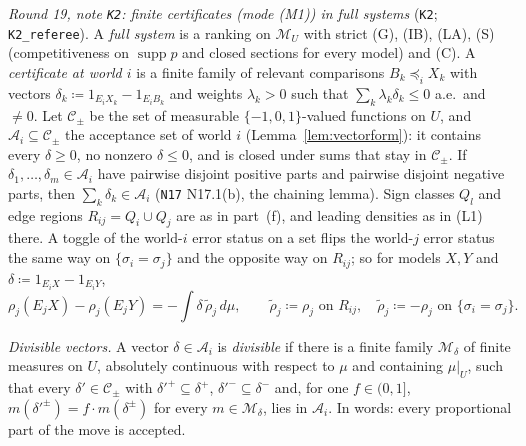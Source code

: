 \documentclass[11pt]{article}
\theoremstyle{definition}
\theoremstyle{remark}
\newcommand{\M}{\mathcal M}
\newcommand{\supp}{\operatorname{supp}}
\newcommand{\src}[1]{\texttt{#1}}
\begin{document}
\emph{Round 19, note \src{K2}: finite certificates (mode (M1)) in full systems} (\src{K2}; \src{K2\_referee}). A \emph{full system} is a ranking on $\M_U$ with strict (G), (IB), (LA), (S) (competitiveness on $\supp p$ and closed sections for every model) and (C). A \emph{certificate at world $i$} is a finite family of relevant comparisons $B_k\preceq_iX_k$ with vectors $\delta_k\coloneqq1_{E_iX_k}-1_{E_iB_k}$ and weights $\lambda_k>0$ such that $\sum_k\lambda_k\delta_k\le0$ a.e.\ and $\ne0$. Let $\mathcal C_{\pm}$ be the set of measurable $\{-1,0,1\}$-valued functions on $U$, and $\mathcal A_i\subseteq\mathcal C_\pm$ the acceptance set of world $i$ (Lemma~\ref{lem:vectorform}): it contains every $\delta\ge0$, no nonzero $\delta\le0$, and is closed under sums that stay in $\mathcal C_\pm$. If $\delta_1,\dots,\delta_m\in\mathcal A_i$ have pairwise disjoint positive parts and pairwise disjoint negative parts, then $\sum_k\delta_k\in\mathcal A_i$ (\src{N17} N17.1(b), the chaining lemma). Sign classes $Q_l$ and edge regions $R_{ij}=Q_i\cup Q_j$ are as in part~(f), and leading densities as in (L1) there. A toggle of the world-$i$ error status on a set flips the world-$j$ error status the same way on $\{\sigma_i=\sigma_j\}$ and the opposite way on $R_{ij}$; so for models $X,Y$ and $\delta\coloneqq1_{E_iX}-1_{E_iY}$,
\[
\rho_j(E_jX)-\rho_j(E_jY)=-\int\delta\,\tilde\rho_j\,d\mu,\qquad\tilde\rho_j\coloneqq\rho_j\text{ on }R_{ij},\quad\tilde\rho_j\coloneqq-\rho_j\text{ on }\{\sigma_i=\sigma_j\}.\tag{K2}
\]

\emph{Divisible vectors.} A vector $\delta\in\mathcal A_i$ is \emph{divisible} if there is a finite family $\mathcal M_\delta$ of finite measures on $U$, absolutely continuous with respect to $\mu$ and containing $\mu|_U$, such that every $\delta'\in\mathcal C_\pm$ with $\delta'^+\subseteq\delta^+$, $\delta'^-\subseteq\delta^-$ and, for one $f\in(0,1]$, $m(\delta'^\pm)=f\cdot m(\delta^\pm)$ for every $m\in\mathcal M_\delta$, lies in $\mathcal A_i$. In words: every proportional part of the move is accepted.
\end{document}
